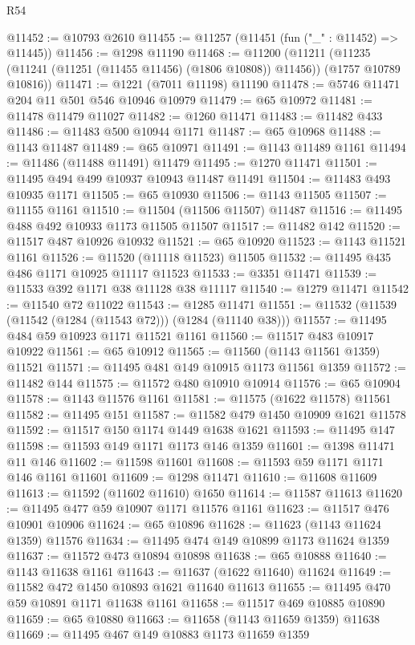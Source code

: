 \begin{lexlean}{R54}
\begin{coremodule}
@11452 := @10793 @2610
@11455 := @11257 (@11451 (fun ("_" : @11452) => @11445))
@11456 := @1298 @11190
@11468 := @11200
    (@11211 (@11235 (@11241 (@11251 (@11455 @11456) (@1806 @10808)) @11456)) (@1757 @10789 @10816))
@11471 := @1221 (@7011 @11198) @11190
@11478 := @5746 @11471 @204 @11 @501 @546 @10946 @10979
@11479 := @65 @10972
@11481 := @11478 @11479 @11027
@11482 := @1260 @11471
@11483 := @11482 @433
@11486 := @11483 @500 @10944 @1171
@11487 := @65 @10968
@11488 := @1143 @11487
@11489 := @65 @10971
@11491 := @1143 @11489 @1161
@11494 := @11486 (@11488 @11491) @11479
@11495 := @1270 @11471
@11501 := @11495 @494 @499 @10937 @10943 @11487 @11491
@11504 := @11483 @493 @10935 @1171
@11505 := @65 @10930
@11506 := @1143 @11505
@11507 := @11155 @1161
@11510 := @11504 (@11506 @11507) @11487
@11516 := @11495 @488 @492 @10933 @1173 @11505 @11507
@11517 := @11482 @142
@11520 := @11517 @487 @10926 @10932
@11521 := @65 @10920
@11523 := @1143 @11521 @1161
@11526 := @11520 (@11118 @11523) @11505
@11532 := @11495 @435 @486 @1171 @10925 @11117 @11523
@11533 := @3351 @11471
@11539 := @11533 @392 @1171 @38 @11128 @38 @11117
@11540 := @1279 @11471
@11542 := @11540 @72 @11022
@11543 := @1285 @11471
@11551 := @11532 (@11539 (@11542 (@1284 (@11543 @72))) (@1284 (@11140 @38)))
@11557 := @11495 @484 @59 @10923 @1171 @11521 @1161
@11560 := @11517 @483 @10917 @10922
@11561 := @65 @10912
@11565 := @11560 (@1143 @11561 @1359) @11521
@11571 := @11495 @481 @149 @10915 @1173 @11561 @1359
@11572 := @11482 @144
@11575 := @11572 @480 @10910 @10914
@11576 := @65 @10904
@11578 := @1143 @11576 @1161
@11581 := @11575 (@1622 @11578) @11561
@11582 := @11495 @151
@11587 := @11582 @479 @1450 @10909 @1621 @11578
@11592 := @11517 @150 @1174 @1449 @1638 @1621
@11593 := @11495 @147
@11598 := @11593 @149 @1171 @1173 @146 @1359
@11601 := @1398 @11471 @11 @146
@11602 := @11598 @11601
@11608 := @11593 @59 @1171 @1171 @146 @1161 @11601
@11609 := @1298 @11471
@11610 := @11608 @11609
@11613 := @11592 (@11602 @11610) @1650
@11614 := @11587 @11613
@11620 := @11495 @477 @59 @10907 @1171 @11576 @1161
@11623 := @11517 @476 @10901 @10906
@11624 := @65 @10896
@11628 := @11623 (@1143 @11624 @1359) @11576
@11634 := @11495 @474 @149 @10899 @1173 @11624 @1359
@11637 := @11572 @473 @10894 @10898
@11638 := @65 @10888
@11640 := @1143 @11638 @1161
@11643 := @11637 (@1622 @11640) @11624
@11649 := @11582 @472 @1450 @10893 @1621 @11640 @11613
@11655 := @11495 @470 @59 @10891 @1171 @11638 @1161
@11658 := @11517 @469 @10885 @10890
@11659 := @65 @10880
@11663 := @11658 (@1143 @11659 @1359) @11638
@11669 := @11495 @467 @149 @10883 @1173 @11659 @1359

\end{coremodule}
\end{lexlean}
